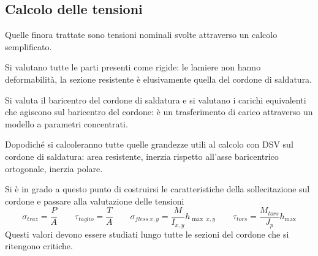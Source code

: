 \documentclass[a4paper, 15pt]{article}
\begin{document}
\subsection{Calcolo delle tensioni}
\begin{adjustwidth}{2in}{} 
	Quelle finora trattate sono tensioni nominali svolte attraverso un calcolo semplificato. \newline 
	
	Si valutano tutte le parti presenti come rigide: le lamiere non hanno deformabilità, la sezione resistente è elusivamente quella del cordone di saldatura. 
	
	Si valuta il baricentro del cordone di saldatura e si valutano i carichi equivalenti che agiscono sul baricentro del cordone: è un trasferimento di carico attraverso un modello a parametri concentrati. 
	
	Dopodiché si calcoleranno tutte quelle grandezze utili al calcolo con DSV sul cordone di saldatura: area resistente, inerzia rispetto all'asse baricentrico ortogonale, inerzia polare. 
	
	Si è in grado a questo punto di costruirsi le caratteristiche della sollecitazione sul cordone e passare alla valutazione delle tensioni
	\[\sigma_{traz} = \dfrac{P}{A} \qquad \tau_{taglio} = \dfrac{T}{A} \qquad \sigma_{fless~x,y} = \dfrac{M}{I_{x,y}}h_{\max~x,y} \qquad \tau_{tors} = \dfrac{M_{tors}}{J_p}h_{\max}\]
	Questi valori devono essere studiati lungo tutte le sezioni del cordone che si ritengono critiche.  
\end{adjustwidth}
\end{document}
